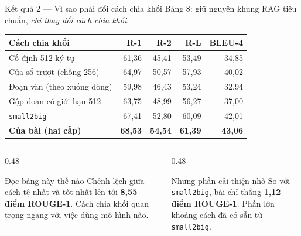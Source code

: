 \documentclass[aspectratio=169,10pt]{beamer}
\begin{document}
\begin{frame}{Kết quả 2 --- Vì sao phải đổi cách chia khối}
  {\small Bảng 8: giữ nguyên khung RAG tiêu chuẩn, \emph{chỉ thay đổi cách chia khối}.}
  \begin{center}
  \small
  \begin{tabular}{p{5.6cm}rrrr}
    \toprule
    \textbf{Cách chia khối} & \textbf{R-1} & \textbf{R-2} & \textbf{R-L} & \textbf{BLEU-4} \\
    \midrule
    Cố định 512 ký tự & 61{,}36 & 45{,}41 & 53{,}49 & 34{,}85 \\
    Cửa sổ trượt (chồng 256) & 64{,}97 & 50{,}57 & 57{,}93 & 40{,}02 \\
    Đoạn văn (theo xuống dòng) & 59{,}98 & 46{,}43 & 53{,}24 & 32{,}94 \\
    Gộp đoạn có giới hạn 512 & 63{,}75 & 48{,}99 & 56{,}27 & 37{,}00 \\
    \texttt{small2big} & 67{,}41 & 52{,}80 & 60{,}09 & 42{,}01 \\
    \textbf{Của bài (hai cấp)} & \textbf{68{,}53} & \textbf{54{,}54} & \textbf{61{,}39} & \textbf{43{,}06} \\
    \bottomrule
  \end{tabular}
  \end{center}
  \vspace{0.3em}
  \begin{columns}[T]
    \begin{column}{0.48\textwidth}
      \begin{alertblock}{\small Đọc bảng này thế nào}
        \small Chênh lệch giữa cách tệ nhất và tốt nhất lên tới \textbf{8{,}55 điểm ROUGE-1}.
        Cách chia khối quan trọng ngang với việc dùng mô hình nào.
      \end{alertblock}
    \end{column}
    \begin{column}{0.48\textwidth}
      \begin{block}{\small Nhưng phần cải thiện nhỏ}
        \small So với \texttt{small2big}, bài chỉ thắng \textbf{1{,}12 điểm ROUGE-1}.
        Phần lớn khoảng cách đã có sẵn từ \texttt{small2big}.
      \end{block}
    \end{column}
  \end{columns}
\end{frame}
\end{document}

